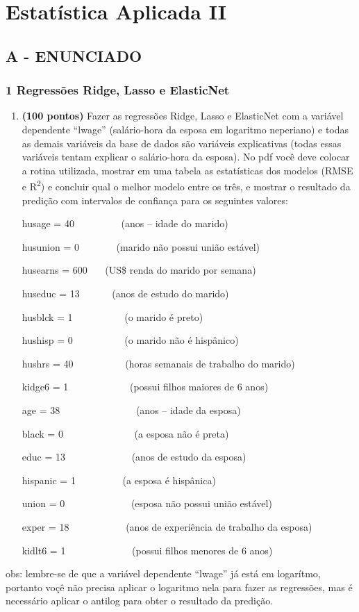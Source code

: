 \label{ap:ap05}
\chapter{Estatística Aplicada II}
\section*{\textbf{A - ENUNCIADO}}

\subsection*{\textbf{1 Regressões Ridge, Lasso e ElasticNet}}


\begin{enumerate}[label=\alph*)]
\item \textbf{(100 pontos) }Fazer as regressões Ridge, Lasso e ElasticNet com a variável dependente “lwage” (salário-hora da
esposa em logaritmo neperiano) e todas as demais variáveis da base de dados são variáveis explicativas (todas essas
variáveis tentam explicar o salário-hora da esposa). No pdf você deve colocar a rotina utilizada, mostrar em uma tabela
as estatísticas dos modelos (RMSE e R\textsuperscript{2}) e concluir qual o melhor modelo entre os três, e mostrar o
resultado da predição com intervalos de confiança para os seguintes valores:

husage = 40 \ \ \ \ \ \ \ \ \ (anos – idade do marido)

husunion = 0 \ \ \ \ \ \ \ (marido não possui união estável)

husearns = 600 \ \ \ (US\$ renda do marido por semana)

huseduc = 13 \ \ \ \ \ \ (anos de estudo do marido)

husblck = 1 \ \ \ \ \ \ \ \ \ \ (o marido é preto)

hushisp = 0 \ \ \ \ \ \ \ \ \ \ (o marido não é hispânico)

hushrs = 40 \ \ \ \ \ \ \ \ \ \ (horas semanais de trabalho do marido)

kidge6 = 1 \ \ \ \ \ \ \ \ \ \ \ \ (possui filhos maiores de 6 anos)

age = 38 \ \ \ \ \ \ \ \ \ \ \ \ \ \ \ (anos – idade da esposa)

black = 0 \ \ \ \ \ \ \ \ \ \ \ \ \ \ (a esposa não é preta)

educ = 13 \ \ \ \ \ \ \ \ \ \ \ \ \ (anos de estudo da esposa)

hispanic = 1 \ \ \ \ \ \ \ \ \ (a esposa é hispânica)

union = 0 \ \ \ \ \ \ \ \ \ \ \ \ \ (esposa não possui união estável)

exper = 18 \ \ \ \ \ \ \ \ \ \ \ (anos de experiência de trabalho da esposa)

kidlt6 = 1 \ \ \ \ \ \ \ \ \ \ \ \ \ (possui filhos menores de 6 anos)
\end{enumerate}
obs: lembre-se de que a variável dependente “lwage” já está em logarítmo, portanto voçê não precisa aplicar o logaritmo
nela para fazer as regressões, mas é necessário aplicar o antilog para obter o resultado da predição. 


